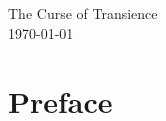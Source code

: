 \documentclass[a4paper]{book}
\begin{document}
\begin{titlepage}
    \begin{center}
        \LARGE{The Curse of Transience}\\
        \Large{\today}
    \end{center}
\end{titlepage}
\thispagestyle{empty}
\frontmatter
\chapter*{Preface}
\tableofcontents
\mainmatter
\end{document}
